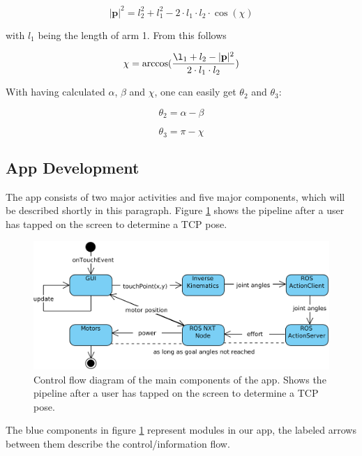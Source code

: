 \documentclass[conference]{IEEEtran}
\begin{document}
\begin{equation}
|\textbf{p}|^2 = l_2^2 + l_1^2 - 2 \cdot l_1 \cdot l_2 \cdot \cos(\chi)
\end{equation}

with $l_1$ being the length of arm 1. From this follows

\begin{equation}
\chi = \arccos(\frac{\l_1 + l_2 - |\textbf{p}|^2}{2 \cdot l_1 \cdot l_2})
\end{equation}

With having calculated $\alpha$, $\beta$ and $\chi$, one can easily get $\theta_2$ and $\theta_3$:

\begin{equation}
\theta_2 = \alpha - \beta
\end{equation}

\begin{equation}
\theta_3 = \pi - \chi
\end{equation}

\subsection{App Development}\label{sec:development}
The app consists of two major activities and five major components, which will be described shortly in this paragraph. Figure \ref{fig:app_pipeline} shows the pipeline after a user has tapped on the screen to determine a TCP pose.

\begin{figure}[htbp]
	\centerline{\includegraphics[scale=0.15]{img/app_pipeline.png}}
	\caption{Control flow diagram of the main components of the app. Shows the pipeline after a user has tapped on the screen to determine a TCP pose.}
	\label{fig:app_pipeline}
\end{figure}

The blue components in figure \ref{fig:app_pipeline} represent modules in our app, the labeled arrows between them describe the control/information flow.
\end{document}
